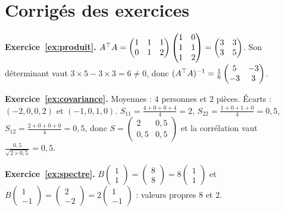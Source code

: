 \section{Corrigés des exercices}
\label{sec:corriges}

\begin{corrige}
\textbf{Exercice~\ref{ex:produit}.}
$A^{\top} A=\begin{pmatrix}1&1&1\\0&1&2\end{pmatrix}\begin{pmatrix}1&0\\1&1\\1&2\end{pmatrix}=\begin{pmatrix}3&3\\3&5\end{pmatrix}$.
Son déterminant vaut $3\times5-3\times3=6\ne0$, donc $(A^{\top} A)^{-1}=\frac16\begin{pmatrix}5&-3\\-3&3\end{pmatrix}$.
\end{corrige}

\begin{corrige}
\textbf{Exercice~\ref{ex:covariance}.}
Moyennes : $4$ personnes et $2$ pièces. Écarts : $(-2,0,0,2)$ et $(-1,0,1,0)$.
$S_{11}=\frac{4+0+0+4}{4}=2$, $S_{22}=\frac{1+0+1+0}{4}=0{,}5$, $S_{12}=\frac{2+0+0+0}{4}=0{,}5$, donc
$S=\begin{pmatrix}2&0{,}5\\0{,}5&0{,}5\end{pmatrix}$ et la corrélation vaut $\frac{0{,}5}{\sqrt{2\times0{,}5}}=0{,}5$.
\end{corrige}

\begin{corrige}
\textbf{Exercice~\ref{ex:spectre}.}
$B\begin{pmatrix}1\\1\end{pmatrix}=\begin{pmatrix}8\\8\end{pmatrix}=8\begin{pmatrix}1\\1\end{pmatrix}$ et $B\begin{pmatrix}1\\-1\end{pmatrix}=\begin{pmatrix}2\\-2\end{pmatrix}=2\begin{pmatrix}1\\-1\end{pmatrix}$ : valeurs propres $8$ et $2$.
\end{corrige}

